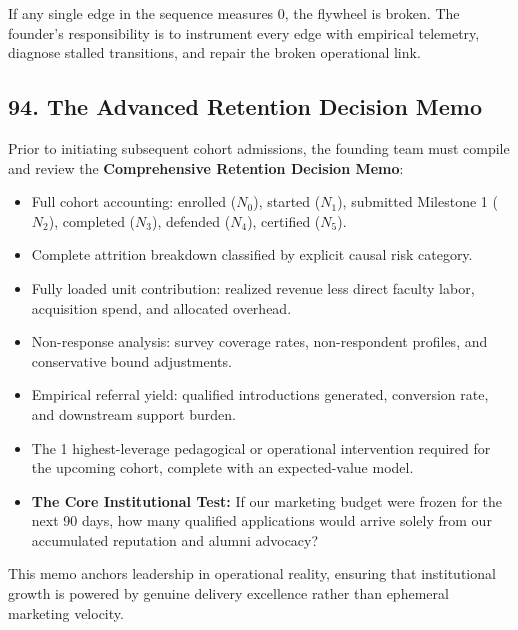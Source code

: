 If any single edge in the sequence measures 0, the flywheel is broken. The founder's responsibility is to instrument every edge with empirical telemetry, diagnose stalled transitions, and repair the broken operational link.

\subsection*{94. The Advanced Retention Decision Memo}

Prior to initiating subsequent cohort admissions, the founding team must compile and review the \textbf{Comprehensive Retention Decision Memo}:
\begin{itemize}[leftmargin=*]
\item Full cohort accounting: enrolled ($N_0$), started ($N_1$), submitted Milestone 1 ($N_2$), completed ($N_3$), defended ($N_4$), certified ($N_5$).
\item Complete attrition breakdown classified by explicit causal risk category.
\item Fully loaded unit contribution: realized revenue less direct faculty labor, acquisition spend, and allocated overhead.
\item Non-response analysis: survey coverage rates, non-respondent profiles, and conservative bound adjustments.
\item Empirical referral yield: qualified introductions generated, conversion rate, and downstream support burden.
\item The 1 highest-leverage pedagogical or operational intervention required for the upcoming cohort, complete with an expected-value model.
\item \textbf{The Core Institutional Test:} If our marketing budget were frozen for the next 90 days, how many qualified applications would arrive solely from our accumulated reputation and alumni advocacy?
\end{itemize}

This memo anchors leadership in operational reality, ensuring that institutional growth is powered by genuine delivery excellence rather than ephemeral marketing velocity.
